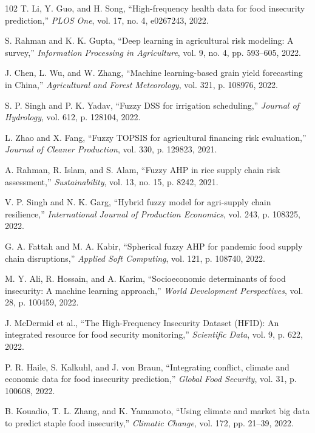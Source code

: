 \documentclass[preprint,12pt]{elsarticle}
\begin{document}
\begin{thebibliography}{102}
		T. Li, Y. Guo, and H. Song, ``High-frequency health data for food insecurity prediction,'' \emph{PLOS One}, vol. 17, no. 4, e0267243, 2022.
		
		S. Rahman and K. K. Gupta, ``Deep learning in agricultural risk modeling: A survey,'' \emph{Information Processing in Agriculture}, vol. 9, no. 4, pp. 593--605, 2022.
		
		J. Chen, L. Wu, and W. Zhang, ``Machine learning-based grain yield forecasting in China,'' \emph{Agricultural and Forest Meteorology}, vol. 321, p. 108976, 2022.
		
		S. P. Singh and P. K. Yadav, ``Fuzzy DSS for irrigation scheduling,'' \emph{Journal of Hydrology}, vol. 612, p. 128104, 2022.
		
		L. Zhao and X. Fang, ``Fuzzy TOPSIS for agricultural financing risk evaluation,'' \emph{Journal of Cleaner Production}, vol. 330, p. 129823, 2021.
		
		A. Rahman, R. Islam, and S. Alam, ``Fuzzy AHP in rice supply chain risk assessment,'' \emph{Sustainability}, vol. 13, no. 15, p. 8242, 2021.
		
		V. P. Singh and N. K. Garg, ``Hybrid fuzzy model for agri-supply chain resilience,'' \emph{International Journal of Production Economics}, vol. 243, p. 108325, 2022.
		
		G. A. Fattah and M. A. Kabir, ``Spherical fuzzy AHP for pandemic food supply chain disruptions,'' \emph{Applied Soft Computing}, vol. 121, p. 108740, 2022.
		
		M. Y. Ali, R. Hossain, and A. Karim, ``Socioeconomic determinants of food insecurity: A machine learning approach,'' \emph{World Development Perspectives}, vol. 28, p. 100459, 2022.
		
		J. McDermid et al., ``The High-Frequency Insecurity Dataset (HFID): An integrated resource for food security monitoring,'' \emph{Scientific Data}, vol. 9, p. 622, 2022.
		
		P. R. Haile, S. Kalkuhl, and J. von Braun, ``Integrating conflict, climate and economic data for food insecurity prediction,'' \emph{Global Food Security}, vol. 31, p. 100608, 2022.
		
		B. Kouadio, T. L. Zhang, and K. Yamamoto, ``Using climate and market big data to predict staple food insecurity,'' \emph{Climatic Change}, vol. 172, pp. 21--39, 2022.
		

\end{thebibliography}
\end{document}
